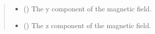 \documentclass[letterpaper,10pt,english]{sphinxmanual}
\begin{document}
\begin{fulllineitems}
\begin{quote}
\begin{description}
\begin{itemize}
\item {} 
 () \textendash{} The y component of the magnetic field.

\item {} 
 () \textendash{} The z component of the magnetic field.

\end{itemize}


\end{description}\end{quote}

\end{fulllineitems}

\end{document}
